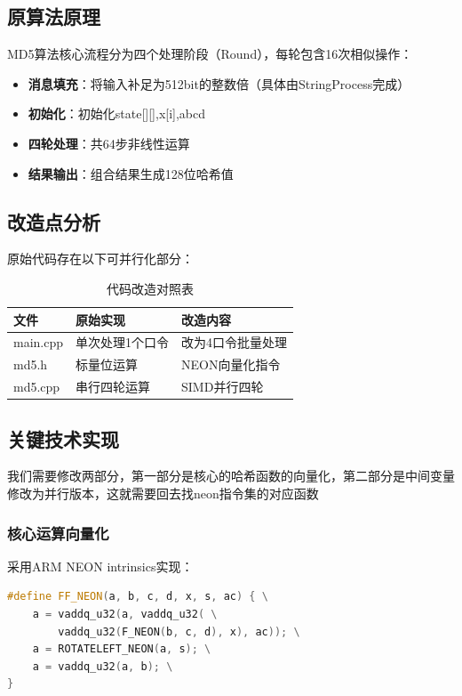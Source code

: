 \documentclass[a4paper]{article}
\begin{document}
\subsection{原算法原理}
MD5算法核心流程分为四个处理阶段（Round），每轮包含16次相似操作：
\begin{itemize}
  \item \textbf{消息填充}：将输入补足为512bit的整数倍（具体由StringProcess完成）
  \item \textbf{初始化}：初始化state[][],x[i],abcd
  \item \textbf{四轮处理}：共64步非线性运算
  \item \textbf{结果输出}：组合结果生成128位哈希值
  \end{itemize}
  

\subsection{改造点分析}
原始代码存在以下可并行化部分：

\begin{table}[h]
\centering
\begin{tabular}{lll}
\toprule
\textbf{文件} & \textbf{原始实现} & \textbf{改造内容} \\
\midrule
main.cpp & 单次处理1个口令 & 改为4口令批量处理 \\
md5.h & 标量位运算 & NEON向量化指令 \\
md5.cpp & 串行四轮运算 & SIMD并行四轮 \\
\bottomrule
\end{tabular}
\caption{代码改造对照表}
\end{table}

\subsection{关键技术实现}
\par 我们需要修改两部分，第一部分是核心的哈希函数的向量化，第二部分是中间变量修改为并行版本，这就需要回去找neon指令集的对应函数
\subsubsection{核心运算向量化}
采用ARM NEON intrinsics实现：

\begin{lstlisting}[language=C++,caption=FF函数的并行版本]
#define FF_NEON(a, b, c, d, x, s, ac) { \
    a = vaddq_u32(a, vaddq_u32( \
        vaddq_u32(F_NEON(b, c, d), x), ac)); \
    a = ROTATELEFT_NEON(a, s); \
    a = vaddq_u32(a, b); \
}
\end{lstlisting}
\end{document}
